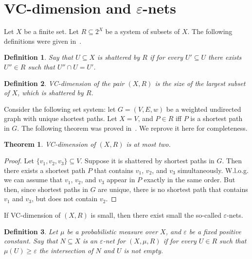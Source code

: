 \documentclass[12pt]{article}
\newcommand{\eps}{\varepsilon}
\newtheorem{definition}{Definition}
\newtheorem{theorem}{Theorem}
\begin{document}
    \section{VC-dimension and $\eps$-nets}

    Let $X$ be a finite set. Let $R \subseteq 2^X$ be a system of subsets of $X$.
    The following definitions were given in~\cite{VC71}.

    \begin{definition}
        Say that $U \subseteq X$ is \emph{shattered} by $R$ if for every $U' \subseteq U$ there exists $U'' \in R$ such that $U'' \cap U = U'$.
    \end{definition}
    \begin{definition}
        \emph{VC-dimension} of the pair $(X, R)$ is the size of the largest subset of $X$, which is shattered by $R$.
    \end{definition}

    Consider the following set system: let $G = (V, E, w)$ be a weighted undirected graph with unique shortest paths.
    Let $X = V$, and $P \in R$ iff $P$ is a shortest path in $G$. The following theorem was proved in~\cite{ADFGW11}. We reprove it here for completeness.

    \begin{theorem}
        \label{vc_shortest}
        VC-dimension of $(X, R)$ is at most two.
    \end{theorem}
    \begin{proof}
        Let $\{v_1, v_2, v_3\} \subseteq V$. Suppose it is shattered by shortest paths in $G$.
        Then there exists a shortest path $P$ that contains $v_1$, $v_2$, and $v_3$ simultaneously.
        W.l.o.g. we can assume that $v_1$, $v_2$, and $v_3$ appear in $P$ exactly in the same order.
        But then, since shortest paths in $G$ are unique, there is no shortest path that contains $v_1$ and $v_3$, but does not contain $v_2$.
    \end{proof}

    If VC-dimension of $(X, R)$ is small, then there exist small the so-called $\eps$-nets.

    \begin{definition}
        Let $\mu$ be a probabilistic measure over $X$, and $\eps$ be a fixed positive constant.
        Say that $N \subseteq X$ is an $\eps$-net for $(X, \mu, R)$ if for every $U \in R$ such that $\mu(U) \geq \eps$ the intersection of $N$ and $U$
        is not empty.
    \end{definition}
\end{document}
